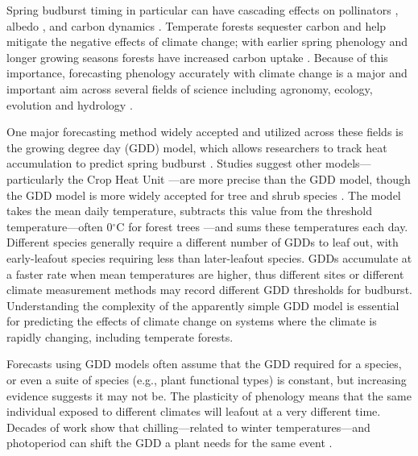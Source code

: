 \documentclass{article}\usepackage[]{graphicx}\usepackage[]{color}
\begin{document}
Spring budburst timing in particular can have cascading effects on pollinators \citep{Boggs2012, Pardee2017}, albedo \citep{Williamson2016}, and carbon dynamics \citep{Richardson2013}. Temperate forests sequester carbon and help mitigate the negative effects of climate change; with earlier spring phenology and longer growing seasons forests have increased carbon uptake \citep{Keenan2014}. Because of this importance, forecasting phenology accurately with climate change is a major and important aim across several fields of science including agronomy, ecology, evolution and hydrology \citep{Moorcroft2001,Bolton2013,Yu2016,Taylor2020}. 
  
One major forecasting method widely accepted and utilized across these fields is the growing degree day (GDD) model, which allows researchers to track heat accumulation to predict spring budburst \citep{Schwartz2006,Vitasse2011,Cook2012,Phillimore2013,Crimmins2020}. Studies suggest other models---particularly the Crop Heat Unit \citep{Kumudini2014,Abendroth2019}---are more precise than the GDD model, though the GDD model is more widely accepted for tree and shrub species \citep{Yu2016,Klosterman2018,Montgomery2020}. The model takes the mean daily temperature, subtracts this value from the threshold temperature---often 0$^{\circ}$C for forest trees \citep[as estimates are proven to be more accurate,][]{Man2010}---and sums these temperatures each day. Different species generally require a different number of GDDs to leaf out, with early-leafout species requiring less than later-leafout species. GDDs accumulate at a faster rate when mean temperatures are higher, thus different sites or different climate measurement methods may record different GDD thresholds for budburst. Understanding the complexity of the apparently simple GDD model \citep{Bonhomme2000} is essential for predicting the effects of climate change on systems where the climate is rapidly changing, including temperate forests. 

Forecasts using GDD models often assume that the GDD required for a species, or even a suite of species (e.g., plant functional types) is constant, but increasing evidence suggests it may not be. The plasticity of phenology means that the same individual exposed to different climates will leafout at a very different time. Decades of work show that chilling---related to winter temperatures---and photoperiod can shift the GDD a plant needs for the same event \citep{Basler2012,Chuine2010,Zohner2016}. 
\end{document}

